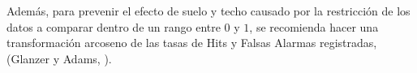 


Además, para prevenir el efecto de suelo y techo causado por la restricción de los datos a comparar dentro de un rango entre $0$ y $1$, se recomienda hacer una transformación arcoseno de las tasas de Hits y Falsas Alarmas registradas, (Glanzer y Adams, \citeyear{Glanzer1990}).\\ 

